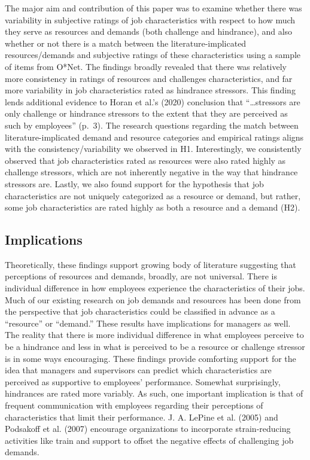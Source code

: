 \documentclass[
  english,
  man]{apa6}
\begin{document}
The major aim and contribution of this paper was to examine whether there was variability in subjective ratings of job characteristics with respect to how much they serve as resources and demands (both challenge and hindrance), and also whether or not there is a match between the literature-implicated resources/demands and subjective ratings of these characteristics using a sample of items from O*Net. The findings broadly revealed that there was relatively more consistency in ratings of resources and challenges characteristics, and far more variability in job characteristics rated as hindrance stressors. This finding lends additional evidence to Horan et al.'s (2020) conclusion that ``\ldots stressors are only challenge or hindrance stressors to the extent that they are perceived as such by employees'' (p.~3). The research questions regarding the match between literature-implicated demand and resource categories and empirical ratings aligns with the consistency/variability we observed in H1. Interestingly, we consistently observed that job characteristics rated as resources were also rated highly as challenge stressors, which are not inherently negative in the way that hindrance stressors are. Lastly, we also found support for the hypothesis that job characteristics are not uniquely categorized as a resource or demand, but rather, some job characteristics are rated highly as both a resource and a demand (H2).

\hypertarget{implications}{%
\subsection{Implications}\label{implications}}

Theoretically, these findings support growing body of literature suggesting that perceptions of resources and demands, broadly, are not universal. There is individual difference in how employees experience the characteristics of their jobs. Much of our existing research on job demands and resources has been done from the perspective that job characteristics could be classified in advance as a ``resource'' or ``demand.''
These results have implications for managers as well. The reality that there is more individual difference in what employees perceive to be a hindrance and less in what is perceived to be a resource or challenge stressor is in some ways encouraging. These findings provide comforting support for the idea that managers and supervisors can predict which characteristics are perceived as supportive to employees' performance. Somewhat surprisingly, hindrances are rated more variably. As such, one important implication is that of frequent communication with employees regarding their perceptions of characteristics that limit their performance. J. A. LePine et al. (2005) and Podsakoff et al. (2007) encourage organizations to incorporate strain-reducing activities like train and support to offset the negative effects of challenging job demands.
\end{document}
